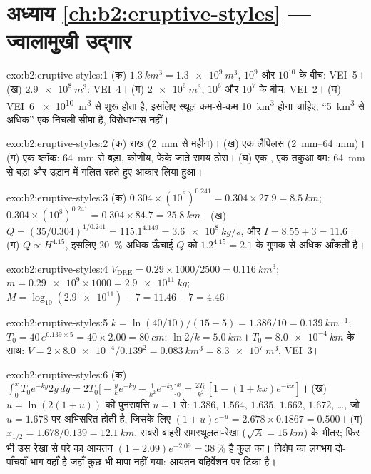 \section*{अध्याय \ref{ch:b2:eruptive-styles} --- ज्वालामुखी उद्गार}

\begin{solution}{exo:b2:eruptive-styles:1}
(क) $\qty{1.3}{km^3} = \qty{1.3e9}{m^3}$, $10^9$ और $10^{10}$ के बीच: VEI~5।
(ख) $\qty{2.9e8}{m^3}$: VEI~4। (ग) $\qty{2e6}{m^3}$, $10^6$ और $10^7$ के बीच:
VEI~2। (घ) VEI~6 \qty{e10}{m^3} से शुरू होता है, इसलिए स्थूल  कम-से-कम
\qty{10}{km^3} होना चाहिए; ``\qty{5}{km^3} से अधिक'' एक निचली सीमा है, विरोधाभास नहीं।
\end{solution}

\begin{solution}{exo:b2:eruptive-styles:2}
(क) राख (\qty{2}{mm} से महीन)। (ख) एक लैपिलस (\qtyrange{2}{64}{mm})।
(ग) एक ब्लॉक: \qty{64}{mm} से बड़ा, कोणीय, फेंके जाते समय ठोस। (घ) एक
, एक तकुआ बम: \qty{64}{mm} से बड़ा और उड़ान में गलित रहते हुए
आकार लिया हुआ।
\end{solution}

\begin{solution}{exo:b2:eruptive-styles:3}
(क) $0.304\times(10^6)^{0.241} = 0.304\times27.9 = \qty{8.5}{km}$;
$0.304\times(10^8)^{0.241} = 0.304\times84.7 = \qty{25.8}{km}$।
(ख) $Q = (35/0.304)^{1/0.241} = 115.1^{4.149} = \qty{3.6e8}{kg/s}$, और $I =
8.55 + 3 = 11.6$। (ग) $Q \propto H^{4.15}$, इसलिए \qty{20}{\percent} अधिक ऊँचाई
$Q$ को $1.2^{4.15} = 2.1$ के गुणक से अधिक आँकती है।
\end{solution}

\begin{solution}{exo:b2:eruptive-styles:4}
$V_{\mathrm{DRE}} = 0.29\times1000/2500 = \qty{0.116}{km^3}$; $m =
\num{0.29e9}\times1000 = \qty{2.9e11}{kg}$; $M = \log_{10}(\num{2.9e11}) - 7 = 11.46
- 7 = 4.46$।
\end{solution}

\begin{solution}{exo:b2:eruptive-styles:5}
$k = \ln(40/10)/(15 - 5) = 1.386/10 = \qty{0.139}{km^{-1}}$; $T_0 = 40\,e^{0.139\times5}
= 40\times2.00 = \qty{80}{cm}$; $\ln2/k = \qty{5.0}{km}$। $T_0 =
\qty{8.0e-4}{km}$ के साथ: $V = 2\times\num{8.0e-4}/0.139^2 = \qty{0.083}{km^3} =
\qty{8.3e7}{m^3}$, VEI~3।
\end{solution}

\begin{solution}{exo:b2:eruptive-styles:6}
(क) $\int_0^x T_0e^{-ky}2y\,dy = 2T_0\big[-\tfrac{y}{k}e^{-ky} - \tfrac{1}{k^2}e^{-ky}\big]_0^x
= \tfrac{2T_0}{k^2}[1 - (1 + kx)e^{-kx}]$। (ख) $u = \ln(2(1 + u))$ की पुनरावृत्ति
$u = 1$ से: $1.386$, $1.564$, $1.635$, $1.662$, $1.672$, \dots, जो
$u = 1.678$ पर अभिसरित होती है, जिसके लिए $(1 + u)e^{-u} = 2.678\times0.1867 = 0.500$। (ग) $x_{1/2} =
1.678/0.139 = \qty{12.1}{km}$, सबसे बाहरी समस्थूलता-रेखा ($\sqrt A =
\qty{15}{km}$) के भीतर; फिर भी उस रेखा से परे का आयतन $(1 + 2.09)e^{-2.09} =
\qty{38}{\percent}$ है कुल का। निक्षेप का लगभग दो-पाँचवाँ भाग वहाँ है जहाँ
कुछ भी मापा नहीं गया: आयतन बहिर्वेशन पर टिका है।
\end{solution}

